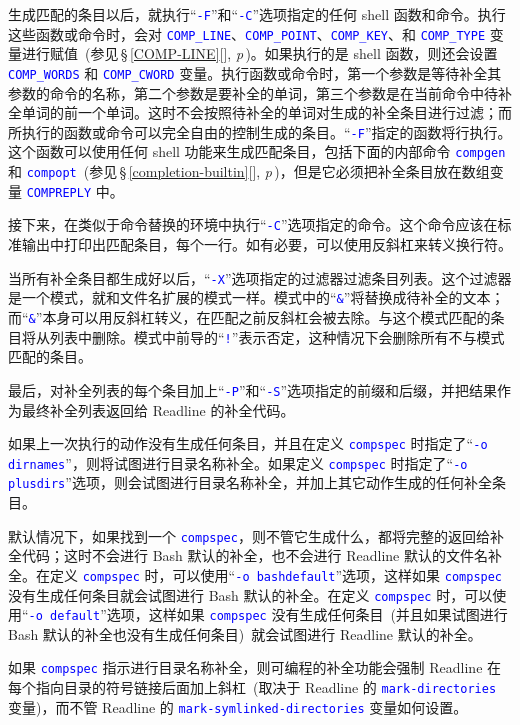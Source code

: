 \documentclass[openany,notitlepage]{book}
\newcommand{\code}[1]{\textcolor{blue}{{\tt #1}}}
\newcommand{\fullref}[1]{\,\S\,\ref{#1}[\nameref{#1}], \textit{p\pageref{#1}}\,}
\begin{document}
\begin{CJK}{UTF8}{song}
生成匹配的条目以后，就执行``\code{-F}''和``\code{-C}''选项指定的任何 shell 函数和命令。执行这些函数或命令时，会对 \code{COMP\_LINE}、\code{COMP\_POINT}、\code{COMP\_KEY}、和 \code{COMP\_TYPE} 变量进行赋值~(参见\fullref{COMP-LINE})。如果执行的是 shell 函数，则还会设置 \code{COMP\_WORDS} 和 \code{COMP\_CWORD} 变量。执行函数或命令时，第一个参数是等待补全其参数的命令的名称，第二个参数是要补全的单词，第三个参数是在当前命令中待补全单词的前一个单词。这时不会按照待补全的单词对生成的补全条目进行过滤；而所执行的函数或命令可以完全自由的控制生成的条目。``\code{-F}''指定的函数将行执行。这个函数可以使用任何 shell 功能来生成匹配条目，包括下面的内部命令 \code{compgen} 和 \code{compopt}~(参见\fullref{completion-builtin})，但是它必须把补全条目放在数组变量 \code{COMPREPLY} 中。

接下来，在类似于命令替换的环境中执行``\code{-C}''选项指定的命令。这个命令应该在标准输出中打印出匹配条目，每个一行。如有必要，可以使用反斜杠来转义换行符。

当所有补全条目都生成好以后，``\code{-X}''选项指定的过滤器过滤条目列表。这个过滤器是一个模式，就和文件名扩展的模式一样。模式中的``\code{\&}''将替换成待补全的文本；而``\code{\&}''本身可以用反斜杠转义，在匹配之前反斜杠会被去除。与这个模式匹配的条目将从列表中删除。模式中前导的``\code{!}''表示否定，这种情况下会删除所有不与模式匹配的条目。

最后，对补全列表的每个条目加上``\code{-P}''和``\code{-S}''选项指定的前缀和后缀，并把结果作为最终补全列表返回给 Readline 的补全代码。

如果上一次执行的动作没有生成任何条目，并且在定义 \code{compspec} 时指定了``\code{-o dirnames}''，则将试图进行目录名称补全。如果定义 \code{compspec} 时指定了``\code{-o plusdirs}''选项，则会试图进行目录名称补全，并加上其它动作生成的任何补全条目。

默认情况下，如果找到一个 \code{compspec}，则不管它生成什么，都将完整的返回给补全代码；这时不会进行 Bash 默认的补全，也不会进行 Readline 默认的文件名补全。在定义 \code{compspec} 时，可以使用``\code{-o bashdefault}''选项，这样如果 \code{compspec} 没有生成任何条目就会试图进行 Bash 默认的补全。在定义 \code{compspec} 时，可以使用``\code{-o default}''选项，这样如果 \code{compspec} 没有生成任何条目~(并且如果试图进行 Bash 默认的补全也没有生成任何条目)~就会试图进行 Readline 默认的补全。

如果 \code{compspec} 指示进行目录名称补全，则可编程的补全功能会强制 Readline 在每个指向目录的符号链接后面加上斜杠~(取决于 Readline 的 \code{mark-directories} 变量)，而不管 Readline 的 \code{mark-symlinked-directories} 变量如何设置。


\end{CJK}
\end{document}
